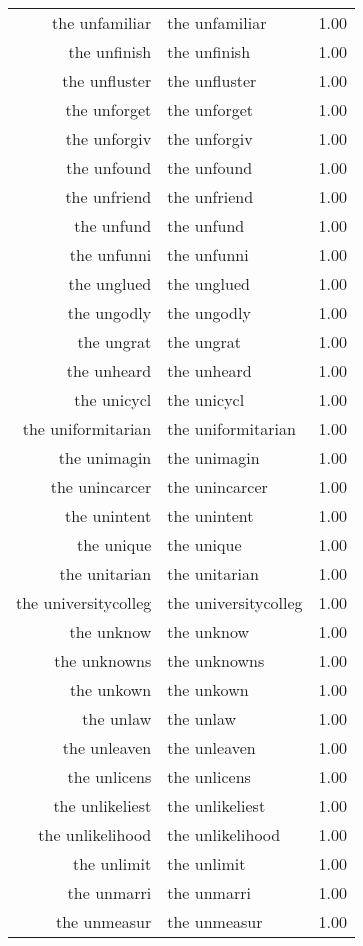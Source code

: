 \begin{table}[ht]
\begin{tabular}{rlr}
  the unfamiliar & the unfamiliar & 1.00 \\ 
  the unfinish & the unfinish & 1.00 \\ 
  the unfluster & the unfluster & 1.00 \\ 
  the unforget & the unforget & 1.00 \\ 
  the unforgiv & the unforgiv & 1.00 \\ 
  the unfound & the unfound & 1.00 \\ 
  the unfriend & the unfriend & 1.00 \\ 
  the unfund & the unfund & 1.00 \\ 
  the unfunni & the unfunni & 1.00 \\ 
  the unglued & the unglued & 1.00 \\ 
  the ungodly & the ungodly & 1.00 \\ 
  the ungrat & the ungrat & 1.00 \\ 
  the unheard & the unheard & 1.00 \\ 
  the unicycl & the unicycl & 1.00 \\ 
  the uniformitarian & the uniformitarian & 1.00 \\ 
  the unimagin & the unimagin & 1.00 \\ 
  the unincarcer & the unincarcer & 1.00 \\ 
  the unintent & the unintent & 1.00 \\ 
  the unique & the unique & 1.00 \\ 
  the unitarian & the unitarian & 1.00 \\ 
  the universitycolleg & the universitycolleg & 1.00 \\ 
  the unknow & the unknow & 1.00 \\ 
  the unknowns & the unknowns & 1.00 \\ 
  the unkown & the unkown & 1.00 \\ 
  the unlaw & the unlaw & 1.00 \\ 
  the unleaven & the unleaven & 1.00 \\ 
  the unlicens & the unlicens & 1.00 \\ 
  the unlikeliest & the unlikeliest & 1.00 \\ 
  the unlikelihood & the unlikelihood & 1.00 \\ 
  the unlimit & the unlimit & 1.00 \\ 
  the unmarri & the unmarri & 1.00 \\ 
  the unmeasur & the unmeasur & 1.00 \\ 

\end{tabular}
\end{table}
